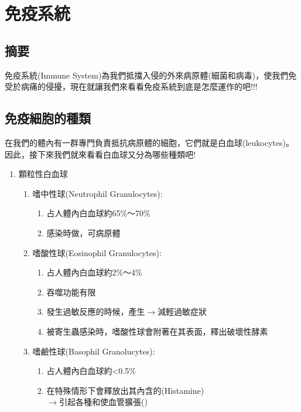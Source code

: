 \chapter{免疫系統}

\section{摘要}
免疫系統(Immune System)為我們抵擋入侵的外來病原體(細菌和病毒)，使我們免受於病痛的侵擾，現在就讓我們來看看免疫系統到底是怎麼運作的吧!!!
\section{免疫細胞的種類}
在我們的體內有一群專門負責抵抗病原體的細胞，它們就是白血球(leukocytes)。因此，接下來我們就來看看白血球又分為哪些種類吧!
\begin{enumerate}
\item 顆粒性白血球
	\begin{enumerate}
	\item 嗜中性球(Neutrophil Granulocytes):
		\begin{enumerate}
		\item 占人體內白血球約65\%～70\%
		\item 感染時做\underline{\hspace{2cm}}，可\underline{\hspace{2cm}}病原體
		\end{enumerate}
	\item 嗜酸性球(Eosinophil Granulocytes):
		\begin{enumerate}
		\item 占人體內白血球約2\%～4\%
		\item 吞噬功能有限
		\item 發生過敏反應的時候，產生\underline{\hspace{2cm}}$\rightarrow$減輕過敏症狀
		\item 被寄生蟲感染時，嗜酸性球會附著在其表面，釋出破壞性酵素
		\end{enumerate}
	\item 嗜鹼性球(Basophil Granolucytes):
		\begin{enumerate}
		\item 占人體內白血球約<0.5\%
		\item 在特殊情形下會釋放出其內含的\underline{\hspace{2cm}}(Histamine)\\
		$\rightarrow$引起各種\underline{\hspace{2cm}}和使血管擴張(\underline{\hspace{2cm}})


\end{enumerate}
\end{enumerate}
\end{enumerate}
